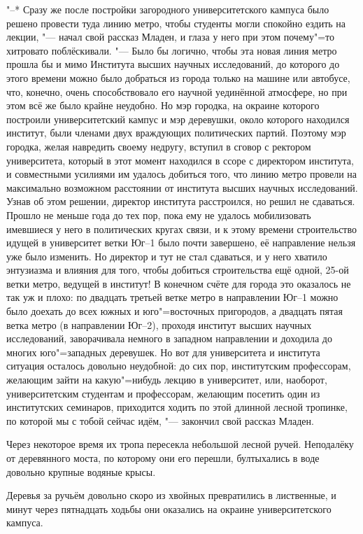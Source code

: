 "--* Сразу же после постройки загородного университетского кампуса было решено
провести туда линию метро, чтобы студенты могли спокойно ездить на лекции,
"--- начал свой рассказ Младен, и глаза у него при этом почему"=то хитровато
поблёскивали.
"--- Было бы логично, чтобы эта новая линия метро прошла бы и мимо Института
высших научных исследований, до которого до этого времени можно было добраться
из города только на машине или автобусе, что, конечно, очень способствовало его
научной уединённой атмосфере, но при этом всё же было крайне неудобно.
Но мэр городка, на окраине которого построили университетский кампус и мэр
деревушки, около которого находился институт, были членами двух враждующих
политических партий.
Поэтому мэр городка, желая навредить своему недругу, вступил в сговор с ректором
университета, который в этот момент находился в ссоре с директором института, и
совместными усилиями им удалось добиться того, что линию метро провели на
максимально возможном расстоянии от института высших научных исследований.
Узнав об этом решении, директор института расстроился, но решил не сдаваться.
Прошло не меньше года до тех пор, пока ему не удалось мобилизовать имевшиеся у
него в политических кругах связи, и к этому времени строительство идущей в
университет ветки Юг--1 было почти завершено, её направление нельзя уже было
изменить.
Но директор и тут не стал сдаваться, и у него хватило энтузиазма и влияния для
того, чтобы добиться строительства ещё одной, 25-ой ветки метро, ведущей в
институт!
В конечном счёте для города это оказалось не так уж и плохо: по двадцать третьей
ветке метро в направлении Юг--1 можно было доехать до всех южных и
юго"=восточных пригородов, а двадцать пятая ветка метро (в направлении Юг--2),
проходя институт высших научных исследований, заворачивала немного в западном
направлении и доходила до многих юго"=западных деревушек.
Но вот для университета и института ситуация осталось довольно неудобной: до сих
пор, институтским профессорам, желающим зайти на какую"=нибудь лекцию в
университет, или, наоборот, университетским студентам и профессорам, желающим
посетить один из институтских семинаров, приходится ходить по этой длинной
лесной тропинке, по которой мы с тобой сейчас идём, "--- закончил свой рассказ
Младен.

Через некоторое время их тропа пересекла небольшой лесной ручей.
Неподалёку от деревянного моста, по которому они его перешли, бултыхались в воде
довольно крупные водяные крысы.

Деревья за ручьём довольно скоро из хвойных превратились в лиственные, и минут
через пятнадцать ходьбы они оказались на окраине университетского кампуса.

